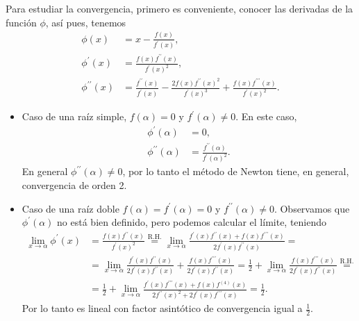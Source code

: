 Para estudiar la convergencia, primero es conveniente, conocer las derivadas de la función $\phi$, así pues,
tenemos
\[
    \begin{aligned}
        \phi(x) &= x - \frac{f(x)}{f^\prime(x)}, \\
        \phi^\prime(x) &= \frac{f(x)f^{\prime \prime}(x)}{f^\prime(x)^2}, \\
        \phi^{\prime \prime}(x) &= \frac{f^{\prime \prime}(x)}{f^\prime(x)} -
        \frac{2 f(x)f^{\prime \prime}(x)^2}{f^\prime(x)^3} +
        \frac{f(x)f^{\prime \prime \prime}(x)}{f^\prime(x)^2}.
    \end{aligned}
\]
\begin{itemize}
    \item Caso de una raíz simple, $f(\alpha) = 0$ y $f^\prime(\alpha) \neq 0$.
        En este caso,
        \[
            \begin{aligned}
                \phi^\prime(\alpha) &= 0, \\
                \phi^{\prime \prime}(\alpha) &= \frac{f^{\prime \prime}(\alpha)}{f^\prime(\alpha)^2}.
            \end{aligned}
        \]
        En general $\phi^{\prime \prime}(\alpha) \neq 0$, por lo tanto el método de Newton
        tiene, en general, convergencia de orden 2.
    \item Caso de una raíz doble $f(\alpha) = f^\prime(\alpha) = 0$ y $f^{\prime \prime}(\alpha) \neq 0$.
        Observamos que $\phi^\prime(\alpha)$ no está bien definido, pero podemos calcular el límite, teniendo
        \[
            \begin{aligned}
                \lim_{x \to \alpha} \phi^\prime(x) &= \frac{f(x)f^{\prime \prime}(x)}{f^\prime(x)^2}
                \stackrel{\text{R.H.}}{=} \lim_{x \to \alpha}
                \frac{f^\prime(x)f^{\prime \prime}(x) + f(x)f^{\prime \prime \prime}(x)}
                {2 f^\prime(x)f^{\prime \prime}(x)} = \\ &= \lim_{x \to \alpha} 
                \frac{f^\prime(x)f^{\prime \prime}(x)}{2 f^\prime(x) f^{\prime \prime}(x)} +
                \frac{f(x)f^{\prime \prime \prime}(x)}{2 f^\prime(x)f^{\prime \prime}(x)} =
                \frac{1}{2} + \lim_{x \to \alpha} \frac{f(x)f^{\prime \prime \prime}(x)}
                {2f^\prime(x)f^{\prime \prime}(x)} \stackrel{\text{R.H.}}{=} \\ &= \frac{1}{2} +
                \lim_{x \to \alpha} \frac{f^\prime(x)f^{\prime \prime \prime}(x) + f(x)f^{(4)}(x)}
                {2f^{\prime \prime}(x)^2 + 2f^\prime(x)f^{\prime \prime \prime}(x)} = \frac{1}{2}.
            \end{aligned}
        \]
        Por lo tanto es lineal con factor asintótico de convergencia igual a $\frac{1}{2}$.


\end{itemize}
